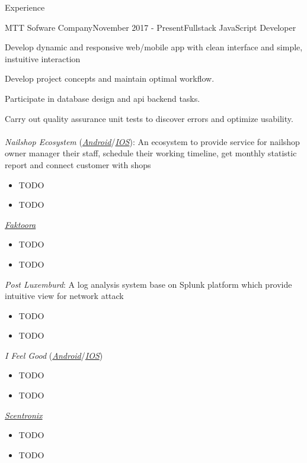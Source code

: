 \documentclass{resume}
\begin{document}
  \begin{rSection}{Experience}
  
    \begin{rSubsection}{MTT Sofware Company}{November 2017 - Present}{Fullstack JavaScript Developer}{}
    \item Develop dynamic and responsive web/mobile app with clean interface and simple, instuitive interaction
    \item Develop project concepts and maintain optimal workflow.
    \item Participate in database design and api backend tasks.
    \item Carry out quality assurance unit tests to discover errors and optimize usability.
    \\\\\emph{Nailshop Ecosystem} (\href{https://app.scnt.me/}{\emph{Android}}/\href{https://app.scnt.me/}{\emph{IOS}}): 
    An ecosystem to provide service for nailshop owner manager their
    staff, schedule their working timeline, get monthly statistic report and connect customer with shops
    \begin{itemize}
      \item TODO
      \item TODO
    \end{itemize}

    \href{http://app.faktoora.com}{\emph{Faktoora}}
    \begin{itemize}
      \item TODO
      \item TODO
    \end{itemize}

    \emph{Post Luxemburd}:
    A log analysis system base on Splunk platform which provide intuitive view for network attack
    \begin{itemize}
      \item TODO
      \item TODO
    \end{itemize}

    \emph{I Feel Good} (\href{https://app.scnt.me/}{\emph{Android}}/\href{https://app.scnt.me/}{\emph{IOS}})
    \begin{itemize}
      \item TODO
      \item TODO
    \end{itemize}

    \href{https://app.scnt.me/}{\emph{Scentronix}}
    \begin{itemize}
      \item TODO
      \item TODO
    \end{itemize}


\end{rSubsection}
\end{rSection}
\end{document}
